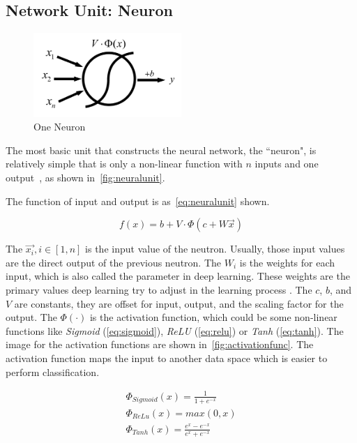 \begin{spacing}{1.5}
\subsection{Network Unit: Neuron}
\label{subsec:neural_unit}

\begin{figure}[ht]
\centering
\includegraphics[width=0.5\textwidth, fbox]{Chapter2/neuralunit.pdf}
\caption{One Neuron}
\label{fig:neuralunit} 
\end{figure}

The most basic unit that constructs the neural network, the ``neuron", is relatively simple that is only a non-linear function with $n$ inputs and one output~\cite{bengio2017deep}, as shown in~\autoref{fig:neuralunit}. 

The function of input and output is as~\autoref{eq:neuralunit} shown. 

\begin{equation}
\label{eq:neuralunit}
    f(x)=b+V \cdot \Phi (c+W \vec{x})
\end{equation}

The $\vec{x_i},i \in [1,n]$ is the input value of the neutron. Usually, those input values are the direct output of the previous neutron. The $W_i$ is the weights for each input, which is also called the parameter in deep learning. These weights are the primary values deep learning try to adjust in the learning process . The $c$, $b$, and $V$ are constants, they are offset for input, output, and the scaling factor for the output. The $\Phi (\cdot)$ is the activation function, which could be some non-linear functions like \textit{Sigmoid} (\autoref{eq:sigmoid}), \textit{ReLU} (\autoref{eq:relu}) or \textit{Tanh} (\autoref{eq:tanh}). The image for the activation functions are shown in~\autoref{fig:activationfunc}. The activation function maps the input to another data space which is easier to perform classification. 



\begin{gather}
   \Phi_{Sigmoid}(x)=\frac{1}{1+e^{-x}} \label{eq:sigmoid}\\
   \Phi_{ReLu}(x)=max(0,x) \label{eq:relu}\\
   \Phi_{Tanh}(x)=\frac{e^{x}-e^{-x}}{e^{x}+e^{-x}} \label{eq:tanh}
\end{gather}


\end{spacing}

